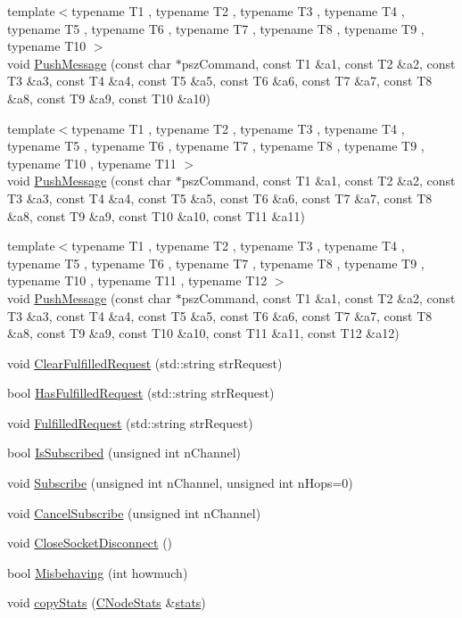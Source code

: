 \begin{DoxyCompactItemize}
\item 
{\footnotesize template$<$typename T1 , typename T2 , typename T3 , typename T4 , typename T5 , typename T6 , typename T7 , typename T8 , typename T9 , typename T10 $>$ }\\void \hyperlink{class_c_node_a64f2ffdff9a32458d6fede8324dfd59f}{Push\+Message} (const char $\ast$psz\+Command, const T1 \&a1, const T2 \&a2, const T3 \&a3, const T4 \&a4, const T5 \&a5, const T6 \&a6, const T7 \&a7, const T8 \&a8, const T9 \&a9, const T10 \&a10)
\item 
{\footnotesize template$<$typename T1 , typename T2 , typename T3 , typename T4 , typename T5 , typename T6 , typename T7 , typename T8 , typename T9 , typename T10 , typename T11 $>$ }\\void \hyperlink{class_c_node_afeef78359562e34d7e62cbea4bc628fd}{Push\+Message} (const char $\ast$psz\+Command, const T1 \&a1, const T2 \&a2, const T3 \&a3, const T4 \&a4, const T5 \&a5, const T6 \&a6, const T7 \&a7, const T8 \&a8, const T9 \&a9, const T10 \&a10, const T11 \&a11)
\item 
{\footnotesize template$<$typename T1 , typename T2 , typename T3 , typename T4 , typename T5 , typename T6 , typename T7 , typename T8 , typename T9 , typename T10 , typename T11 , typename T12 $>$ }\\void \hyperlink{class_c_node_a9e9e15c8ba33b19041cbf2c2ffdbe9ab}{Push\+Message} (const char $\ast$psz\+Command, const T1 \&a1, const T2 \&a2, const T3 \&a3, const T4 \&a4, const T5 \&a5, const T6 \&a6, const T7 \&a7, const T8 \&a8, const T9 \&a9, const T10 \&a10, const T11 \&a11, const T12 \&a12)
\item 
void \hyperlink{class_c_node_aa57c7ad448501f5c8667d430b390b5ea}{Clear\+Fulfilled\+Request} (std\+::string str\+Request)
\item 
bool \hyperlink{class_c_node_ae94af0e82ca84242e420fc53debe6f25}{Has\+Fulfilled\+Request} (std\+::string str\+Request)
\item 
void \hyperlink{class_c_node_a5b378bdd447e2f1e63ced2ae5b36ed76}{Fulfilled\+Request} (std\+::string str\+Request)
\item 
bool \hyperlink{class_c_node_a2309cc5f763bce683337201ea5a640a2}{Is\+Subscribed} (unsigned int n\+Channel)
\item 
void \hyperlink{class_c_node_a47f2a21abf98bd2d2dba2894124d3114}{Subscribe} (unsigned int n\+Channel, unsigned int n\+Hops=0)
\item 
void \hyperlink{class_c_node_ac1be1dbc7917e7f5956dd063bd6f271d}{Cancel\+Subscribe} (unsigned int n\+Channel)
\item 
void \hyperlink{class_c_node_a63a6091a0b0fc0987d9436e1ec708423}{Close\+Socket\+Disconnect} ()
\item 
bool \hyperlink{class_c_node_a1923dffc7124eeedcc4bb58c2cd75754}{Misbehaving} (int howmuch)
\item 
void \hyperlink{class_c_node_aaa77188d9df85b80e3f8a30292acf6a9}{copy\+Stats} (\hyperlink{class_c_node_stats}{C\+Node\+Stats} \&\hyperlink{db__bench_8cc_a5925d216740c89f43482df806fd14e8c}{stats})
\end{DoxyCompactItemize}
